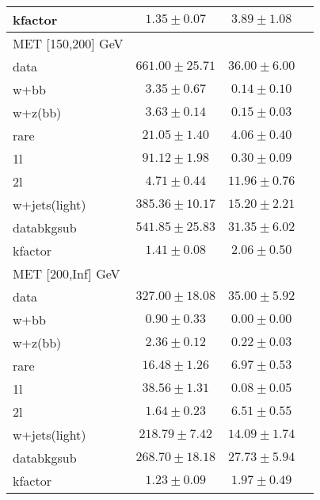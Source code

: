 \begin{table}
\begin{center}
\begin{tabular}{lccc}
kfactor&$1.35\pm0.07$&$3.89\pm1.08$\\
\hline\hline
\hline
MET [150,200] GeV   & &\\
\hline
data&$661.00\pm25.71$&$36.00\pm6.00$\\
\hline
w+bb&$3.35\pm0.67$&$0.14\pm0.10$\\
w+z(bb)&$3.63\pm0.14$&$0.15\pm0.03$\\
rare&$21.05\pm1.40$&$4.06\pm0.40$\\
1l&$91.12\pm1.98$&$0.30\pm0.09$\\
2l&$4.71\pm0.44$&$11.96\pm0.76$\\
w+jets(light)&$385.36\pm10.17$&$15.20\pm2.21$\\
\hline
databkgsub&$541.85\pm25.83$&$31.35\pm6.02$\\
kfactor&$1.41\pm0.08$&$2.06\pm0.50$\\
\hline\hline
\hline
MET [200,Inf] GeV & &\\
\hline
data&$327.00\pm18.08$&$35.00\pm5.92$\\
\hline
w+bb&$0.90\pm0.33$&$0.00\pm0.00$\\
w+z(bb)&$2.36\pm0.12$&$0.22\pm0.03$\\
rare&$16.48\pm1.26$&$6.97\pm0.53$\\
1l&$38.56\pm1.31$&$0.08\pm0.05$\\
2l&$1.64\pm0.23$&$6.51\pm0.55$\\
w+jets(light)&$218.79\pm7.42$&$14.09\pm1.74$\\
\hline
databkgsub&$268.70\pm18.18$&$27.73\pm5.94$\\
kfactor&$1.23\pm0.09$&$1.97\pm0.49$\\
\hline\hline
\hline
\end{tabular}
\end{center}
\end{table}
